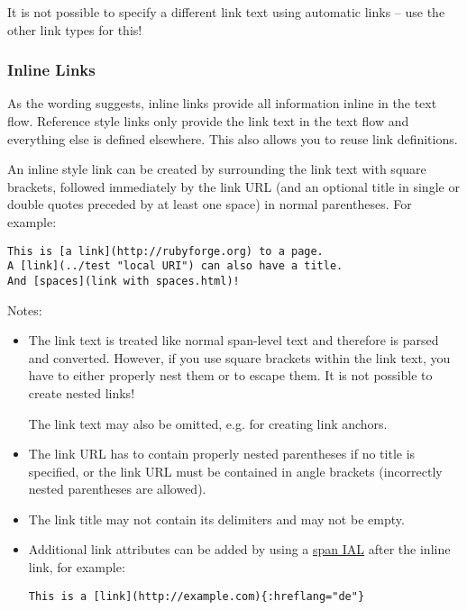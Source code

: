 \documentclass[a4paper]{article}
\begin{document}
It is not possible to specify a different link text using automatic
links -- use the other link types for this!

\hypertarget{inline-links}{\subsubsection{Inline
Links}\label{inline-links}}

As the wording suggests, inline links provide all information inline in
the text flow. Reference style links only provide the link text in the
text flow and everything else is defined elsewhere. This also allows you
to reuse link definitions.

An inline style link can be created by surrounding the link text with
square brackets, followed immediately by the link URL (and an optional
title in single or double quotes preceded by at least one space) in
normal parentheses. For example:

\begin{verbatim}
This is [a link](http://rubyforge.org) to a page.
A [link](../test "local URI") can also have a title.
And [spaces](link with spaces.html)!
\end{verbatim}

Notes:

\begin{itemize}
\item
  The link text is treated like normal span-level text and therefore is
  parsed and converted. However, if you use square brackets within the
  link text, you have to either properly nest them or to escape them. It
  is not possible to create nested links!

  The link text may also be omitted, e.g. for creating link anchors.
\item
  The link URL has to contain properly nested parentheses if no title is
  specified, or the link URL must be contained in angle brackets
  (incorrectly nested parentheses are allowed).
\item
  The link title may not contain its delimiters and may not be empty.
\item
  Additional link attributes can be added by using a
  \protect\hyperlink{span-ials}{span IAL} after the inline link, for
  example:

\begin{verbatim}
This is a [link](http://example.com){:hreflang="de"}
\end{verbatim}
\end{itemize}
\end{document}
